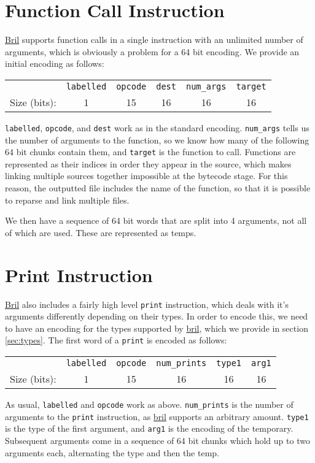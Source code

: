 \documentclass{article}
\newcommand{\bril}{\href{https://capra.cs.cornell.edu/bril/}{bril}}
\newcommand{\Bril}{\href{https://capra.cs.cornell.edu/bril/}{Bril}}
\begin{document}
\section{Function Call Instruction}
\Bril{} supports function calls in a single instruction with an unlimited number
of arguments, which is obviously a problem for a 64 bit encoding. We provide an
initial encoding as follows:
\begin{center}
  \begin{tabular}{r|c|c|c|c|c|}
    \cline{2-6}
    & \texttt{labelled} & \texttt{opcode} & \texttt{dest} & \texttt{num\_args}
    & \texttt{target} \\ \cline{2-6}
    Size (bits): & 1 & 15 & 16 & 16 & 16 \\ \cline{2-6}
  \end{tabular}
\end{center}
\texttt{labelled}, \texttt{opcode}, and \texttt{dest} work as in the standard
encoding. \texttt{num\_args} tells us the number of arguments to the function, so
we know how many of the following 64 bit chunks contain them, and
\texttt{target} is the function to call. Functions are represented as their
indices in order they appear in the source, which makes linking multiple sources
together impossible at the bytecode stage. For this reason, the outputted file
includes the name of the function, so that it is possible to reparse and link
multiple files.

We then have a sequence of 64 bit words that are split into 4 arguments, not all
of which are used. These are represented as temps.

\section{Print Instruction}
\Bril{} also includes a fairly high level \texttt{print} instruction, which
deals with it's arguments differently depending on their types. In order to
encode this, we need to have an encoding for the types supported by \bril{},
which we provide in section \ref{sec:types}. The first word of a \texttt{print}
is encoded as follows:
\begin{center}
  \begin{tabular}{r|c|c|c|c|c|}
    \cline{2-6}
    & \texttt{labelled} & \texttt{opcode} & \texttt{num\_prints} & \texttt{type1}
    & \texttt{arg1} \\ \cline{2-6}
    Size (bits): & 1 & 15 & 16 & 16 & 16 \\ \cline{2-6}
  \end{tabular}
\end{center}
As usual, \texttt{labelled} and \texttt{opcode} work as
above. \texttt{num\_prints} is the number of arguments to the \texttt{print}
instruction, as \bril{} supports an arbitrary amount. \texttt{type1} is the type
of the first argument, and \texttt{arg1} is the encoding of the
temporary. Subsequent arguments come in a sequence of 64 bit chunks which hold
up to two arguments each, alternating the type and then the temp.
\end{document}
